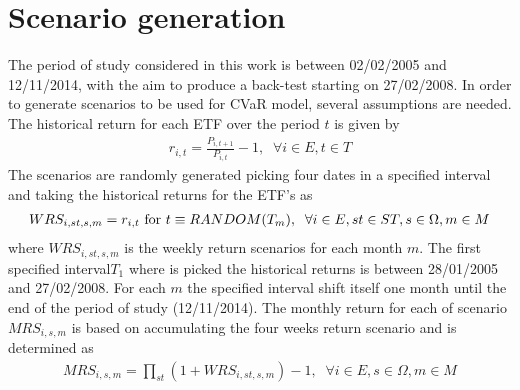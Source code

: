 \section{Scenario generation}

The period of study considered in this work is  between 02/02/2005 and 12/11/2014, with the aim to produce a back-test starting on 27/02/2008.
In order to generate scenarios to be used for CVaR model, several assumptions are needed. The historical return for each ETF over the period $t$ is given by
\begin{gather}
r_{i,t} = \frac{P_{i,t+1}}{P_{i,t}}-1, \;\; \forall i \in E, t \in T
\end{gather}
The scenarios are randomly generated picking four dates in a specified interval and taking the historical returns for the ETF's as
\begin{gather}
WRS_{i,st,s,m} = r_{i,t}  \textup{ for } t \equiv RANDOM(T_{m}), \;\; \forall i \in E, st \in ST, s \in \Omega, m \in M
\end{gather}
where $WRS_{i,st,s,m}$ is the weekly return scenarios for each month $m$.
The first specified interval$T_1$ where is picked the historical returns is between 28/01/2005 and 27/02/2008.
For each $m$ the specified interval shift itself one month until the end of the period of study (12/11/2014).
The monthly return for each of scenario $MRS_{i,s,m}$ is based on accumulating the four weeks return scenario and is determined as
\begin{gather}
MRS_{i,s,m} = \prod_{st} (1+WRS_{i,st,s,m}) -1, \;\; \forall i \in E, s \in \Omega, m \in M
\end{gather}
